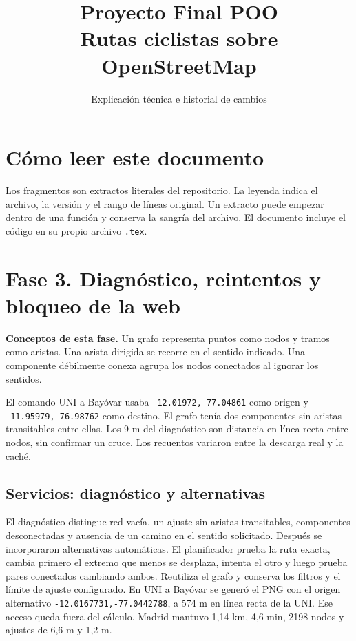 \documentclass[11pt,a4paper]{article}
\title{Proyecto Final POO\\Rutas ciclistas sobre OpenStreetMap}
\author{Explicación técnica e historial de cambios}
\date{}
\begin{document}
\maketitle
\tableofcontents
\clearpage

\section*{Cómo leer este documento}
Los fragmentos son extractos literales del repositorio. La leyenda indica
el archivo, la versión y el rango de líneas original. Un extracto puede
empezar dentro de una función y conserva la sangría del archivo. El documento
incluye el código en su propio archivo \texttt{.tex}.

\section{Fase 3. Diagnóstico, reintentos y bloqueo de la web}

\textbf{Conceptos de esta fase.} Un grafo representa puntos como nodos y tramos como aristas. Una arista dirigida se recorre en el sentido indicado. Una componente débilmente conexa agrupa los nodos conectados al ignorar los sentidos.

El comando UNI a Bayóvar usaba \texttt{-12.01972,-77.04861} como origen y \texttt{-11.95979,-76.98762} como destino. El grafo tenía dos componentes sin aristas transitables entre ellas. Los 9 m del diagnóstico son distancia en línea recta entre nodos, sin confirmar un cruce. Los recuentos variaron entre la descarga real y la caché.

\subsection{Servicios: diagnóstico y alternativas}
El diagnóstico distingue red vacía, un ajuste sin aristas transitables, componentes desconectadas y ausencia de un camino en el sentido solicitado. Después se incorporaron alternativas automáticas. El planificador prueba la ruta exacta, cambia primero el extremo que menos se desplaza, intenta el otro y luego prueba pares conectados cambiando ambos. Reutiliza el grafo y conserva los filtros y el límite de ajuste configurado. En UNI a Bayóvar se generó el PNG con el origen alternativo \texttt{-12.0167731,-77.0442788}, a 574 m en línea recta de la UNI. Ese acceso queda fuera del cálculo. Madrid mantuvo 1,14 km, 4,6 min, 2198 nodos y ajustes de 6,6 m y 1,2 m.
\end{document}
